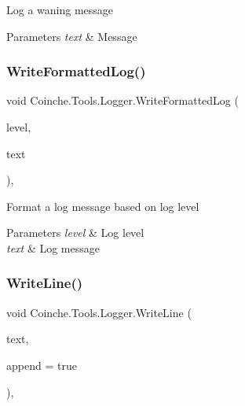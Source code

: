 Log a waning message 


\begin{DoxyParams}{Parameters}
{\em text} & Message\\
\hline
\end{DoxyParams}
\mbox{\label{class_coinche_1_1_tools_1_1_logger_abe673ff15df5c49450232baf995bb74a}} 
\subsubsection{\texorpdfstring{Write\+Formatted\+Log()}{WriteFormattedLog()}}
{\footnotesize\ttfamily void Coinche.\+Tools.\+Logger.\+Write\+Formatted\+Log (\begin{DoxyParamCaption}\item[{\hyperlink{class_coinche_1_1_tools_1_1_logger_a92fb562053cc0a63b44bd10d2fb7d929}{Log\+Level}}]{level,  }\item[{string}]{text }\end{DoxyParamCaption})\hspace{0.3cm}{\ttfamily [inline]}, {\ttfamily [private]}}



Format a log message based on log level 


\begin{DoxyParams}{Parameters}
{\em level} & Log level\\
\hline
{\em text} & Log message\\
\hline
\end{DoxyParams}
\mbox{\label{class_coinche_1_1_tools_1_1_logger_a92c8eb1380a72b2ac5cee18aec78cce8}} 
\subsubsection{\texorpdfstring{Write\+Line()}{WriteLine()}}
{\footnotesize\ttfamily void Coinche.\+Tools.\+Logger.\+Write\+Line (\begin{DoxyParamCaption}\item[{string}]{text,  }\item[{bool}]{append = {\ttfamily true} }\end{DoxyParamCaption})\hspace{0.3cm}{\ttfamily [inline]}, {\ttfamily [private]}}



